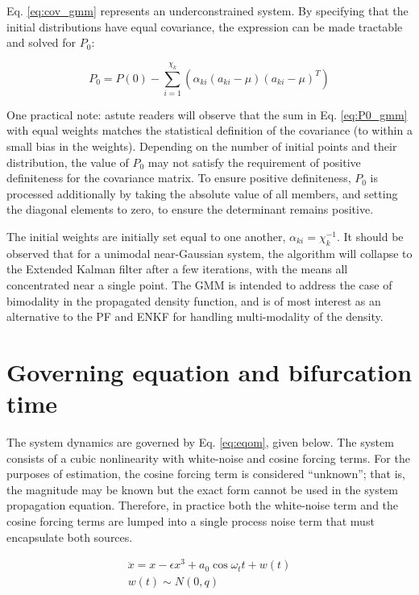 \documentclass[]{article}
\begin{document}
Eq. \ref{eq:cov_gmm} represents an underconstrained system. By specifying that the initial distributions have equal covariance, the expression can be made tractable and solved for $P_{0}$:

\begin{equation}
	P_{0} = P(0) - \sum_{i=1}^{\chi_k} (\alpha_{ki}(a_{ki}-\mu)(a_{ki}-\mu)^T)
	\label{eq:P0_gmm}
\end{equation}

One practical note: astute readers will observe that the sum in Eq. \ref{eq:P0_gmm} with equal weights matches the statistical definition of the covariance (to within a small bias in the weights). Depending on the number of initial points and their distribution, the value of $P_{0}$ may not satisfy the requirement of positive definiteness for the covariance matrix. To ensure positive definiteness, $P_{0}$ is processed additionally by taking the absolute value of all members, and setting the diagonal elements to zero, to ensure the determinant remains positive.

The initial weights are initially set equal to one another, $\alpha_{ki} = \chi_k^{-1}$. It should be observed that for a unimodal near-Gaussian system, the algorithm will collapse to the Extended Kalman filter after a few iterations, with the means all concentrated near a single point. The GMM is intended to address the case of bimodality in the propagated density function, and is of most interest as an alternative to the PF and ENKF for handling multi-modality of the density.

\section{Governing equation and bifurcation time}

The system dynamics are governed by Eq. \ref{eq:eqom}, given below. The system consists of a cubic nonlinearity with white-noise and cosine forcing terms. For the purposes of estimation, the cosine forcing term is considered ``unknown''; that is, the magnitude may be known but the exact form cannot be used in the system propagation equation. Therefore, in practice both the white-noise term and the cosine forcing terms are lumped into a single process noise term that must encapsulate both sources.

\begin{align}
\ddot{x} = x - \epsilon x^3 + a_0 \cos{\omega_t t} + w(t) \label{eq:eqom} \\
w(t) \sim N(0,q)
\end{align}
\end{document}
